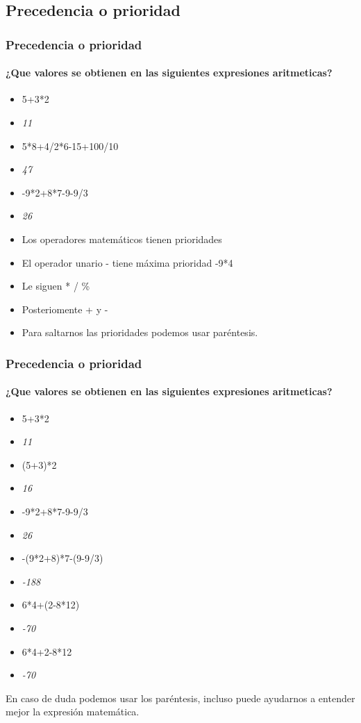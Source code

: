 \documentclass{beamer}
\begin{document}
\subsection{Precedencia o prioridad}
\begin{frame}
\frametitle{Precedencia o prioridad}
\framesubtitle{¿Que valores se obtienen en las siguientes expresiones aritmeticas?}
\begin{itemize}[<+->]
\item 5+3*2
\item \emph{11} 
\item 5*8+4/2*6-15+100/10
\item \emph{47}
\item -9*2+8*7-9-9/3
\item \emph{26}
\end{itemize}
\pause
\begin{itemize}[<+-|alert@+>]
\item Los operadores matemáticos tienen prioridades
\item El operador unario - tiene máxima prioridad -9*4
\item Le siguen * / \%
\item Posteriomente + y -
\item Para saltarnos las prioridades podemos usar paréntesis.
\end{itemize}
\pause

\end{frame}

\begin{frame}
\frametitle{Precedencia o prioridad}
\framesubtitle{¿Que valores se obtienen en las siguientes expresiones aritmeticas?}
\begin{itemize}[<+->]
\item 5+3*2
\item \emph{11} 
\item (5+3)*2
\item \emph{16}
\item -9*2+8*7-9-9/3
\item \emph{26}
\item -(9*2+8)*7-(9-9/3)
\item \emph{-188}
\item 6*4+(2-8*12)
\item \emph{-70}
\item 6*4+2-8*12
\item \emph{-70}
\end{itemize}
\pause
En caso de duda podemos usar los paréntesis, incluso puede ayudarnos a entender mejor la expresión matemática.
\end{frame}
\end{document}
